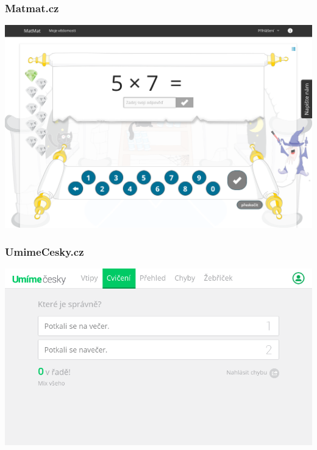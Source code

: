 \documentclass[xcolor=svgnames]{beamer}
\begin{document}
\begin{frame}
	\frametitle{Matmat.cz}
   \includegraphics[width=\textwidth]{img/matmat}
\end{frame}
\begin{frame}
	\frametitle{UmimeCesky.cz}
   \includegraphics[width=\textwidth]{img/umimecesky}
\end{frame}
\end{document}
